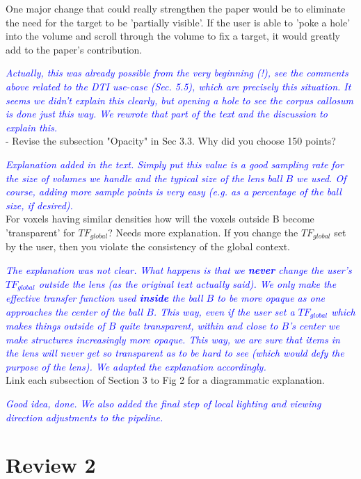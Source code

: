 \documentclass[a4paper,10pt]{article}
\newcommand{\rr}[1]{\emph{\textcolor{blue}{#1}}}
\begin{document}
    One major change that could really strengthen the paper would be to eliminate the
    need for the target to be 'partially visible'. If the user is able to 'poke a
    hole' into the volume and scroll through the volume to fix a target, it would
    greatly add to the paper's contribution.
    
    \rr{Actually, this was already possible from the very beginning (!), see the comments above related to the DTI use-case (Sec. 5.5), which are precisely this situation. It seems we didn't explain this clearly, but opening a hole to see the corpus callosum is done just this way. We rewrote that part of the text and the discussion to explain this.}\\
    
    - Revise the subsection "Opacity" in Sec 3.3. Why did you choose 150 points? 
    
    \rr{Explanation added in the text. Simply put this value is a good sampling rate for the size of volumes we handle and the typical size of the lens ball $B$ we used. Of course, adding more sample points is very easy (e.g. as a percentage of the ball size, if desired).}\\
    
    For voxels having similar densities how will the voxels outside B become 'transparent'
    for $TF_{global}$? Needs more explanation. If you change the $TF_{global}$ set by the
    user, then you violate the consistency of the global context.
    
    \rr{The explanation was not clear. What happens is that we \textbf{never} change the user's $TF_{global}$ outside the lens (as the original text actually said). We only make the effective transfer function used \textbf{inside} the ball $B$ to be more opaque as one approaches the center of the ball $B$. This way, even if the user set a $TF_{global}$ which makes things outside of $B$ quite transparent, within and close to $B$'s center we make structures increasingly more opaque. This way, we are sure that items in the lens will never get so transparent as to be hard to see (which would defy the purpose of the lens). We adapted the explanation accordingly.}\\

    Link each subsection of Section 3 to Fig 2 for a diagrammatic explanation.
    
    \rr{Good idea, done. We also added the final step of local lighting and viewing direction adjustments to the pipeline.} 

\section{Review 2}
\end{document}
